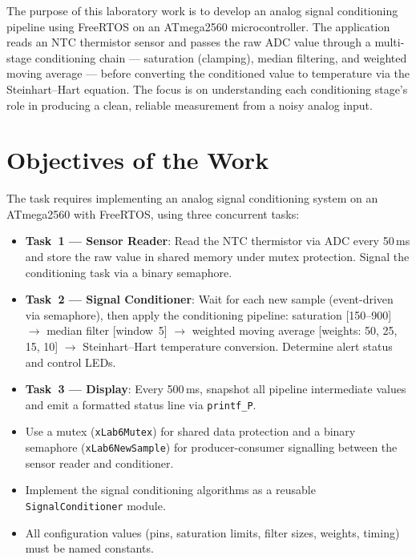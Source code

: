 \documentclass[12pt]{article}
\begin{document}
The purpose of this laboratory work is to develop an analog signal conditioning pipeline using FreeRTOS on an ATmega2560 microcontroller. The application reads an NTC thermistor sensor and passes the raw ADC value through a multi-stage conditioning chain --- saturation (clamping), median filtering, and weighted moving average --- before converting the conditioned value to temperature via the Steinhart--Hart equation. The focus is on understanding each conditioning stage's role in producing a clean, reliable measurement from a noisy analog input.

\section{Objectives of the Work}

The task requires implementing an analog signal conditioning system on an ATmega2560 with FreeRTOS, using three concurrent tasks:
\begin{itemize}
  \item \textbf{Task~1 --- Sensor Reader}: Read the NTC thermistor via ADC every 50\,ms and store the raw value in shared memory under mutex protection. Signal the conditioning task via a binary semaphore.
  \item \textbf{Task~2 --- Signal Conditioner}: Wait for each new sample (event-driven via semaphore), then apply the conditioning pipeline: saturation [150--900] $\to$ median filter [window~5] $\to$ weighted moving average [weights: 50, 25, 15, 10] $\to$ Steinhart--Hart temperature conversion. Determine alert status and control LEDs.
  \item \textbf{Task~3 --- Display}: Every 500\,ms, snapshot all pipeline intermediate values and emit a formatted status line via \texttt{printf\_P}.
  \item Use a mutex (\texttt{xLab6Mutex}) for shared data protection and a binary semaphore (\texttt{xLab6NewSample}) for producer-consumer signalling between the sensor reader and conditioner.
  \item Implement the signal conditioning algorithms as a reusable \texttt{SignalConditioner} module.
  \item All configuration values (pins, saturation limits, filter sizes, weights, timing) must be named constants.
\end{itemize}
\end{document}
